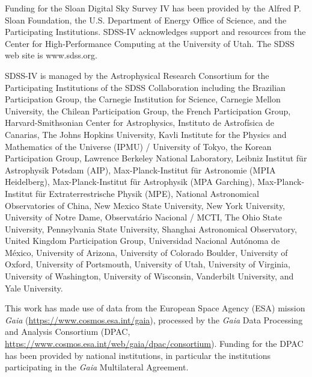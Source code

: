 \documentclass[modern]{aastex62}
\begin{document}
Funding for the Sloan Digital Sky Survey IV has been provided by the Alfred P. Sloan Foundation, the U.S. Department of Energy Office of Science, and the Participating Institutions. SDSS-IV acknowledges support and resources from the Center for High-Performance Computing at
the University of Utah. The SDSS web site is www.sdss.org.

SDSS-IV is managed by the Astrophysical Research Consortium for the 
Participating Institutions of the SDSS Collaboration including the 
Brazilian Participation Group, the Carnegie Institution for Science, 
Carnegie Mellon University, the Chilean Participation Group, the French Participation Group, Harvard-Smithsonian Center for Astrophysics, 
Instituto de Astrof\'isica de Canarias, The Johns Hopkins University, 
Kavli Institute for the Physics and Mathematics of the Universe (IPMU) / 
University of Tokyo, the Korean Participation Group, Lawrence Berkeley National Laboratory, 
Leibniz Institut f\"ur Astrophysik Potsdam (AIP),  
Max-Planck-Institut f\"ur Astronomie (MPIA Heidelberg), 
Max-Planck-Institut f\"ur Astrophysik (MPA Garching), 
Max-Planck-Institut f\"ur Extraterrestrische Physik (MPE), 
National Astronomical Observatories of China, New Mexico State University, 
New York University, University of Notre Dame, 
Observat\'ario Nacional / MCTI, The Ohio State University, 
Pennsylvania State University, Shanghai Astronomical Observatory, 
United Kingdom Participation Group,
Universidad Nacional Aut\'onoma de M\'exico, University of Arizona, 
University of Colorado Boulder, University of Oxford, University of Portsmouth, 
University of Utah, University of Virginia, University of Washington, University of Wisconsin, 
Vanderbilt University, and Yale University.

This work has made use of data from the European Space Agency (ESA) mission
{\it Gaia} (\url{https://www.cosmos.esa.int/gaia}), processed by the {\it Gaia}
Data Processing and Analysis Consortium (DPAC,
\url{https://www.cosmos.esa.int/web/gaia/dpac/consortium}). Funding for the DPAC
has been provided by national institutions, in particular the institutions
participating in the {\it Gaia} Multilateral Agreement.

\color{gcolor}{HOGG: grants etc}\color{black} 

\color{gcolor}{ADAM: grants etc, FAST acknowledgement?}\color{black}

\end{document}
